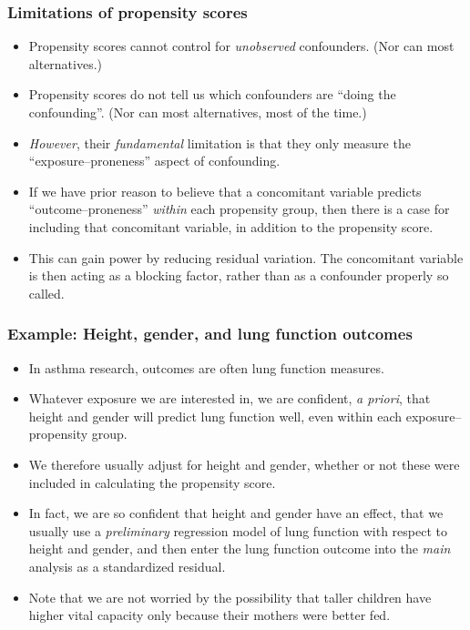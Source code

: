 \documentclass[11pt]{beamer}
\begin{document}
\begin{frame}
\frametitle{Limitations of propensity scores}

\begin{itemize}

\item<2-> Propensity scores cannot control for \textit{unobserved} confounders. (Nor can most alternatives.)

\item<3-> Propensity scores do not tell us which confounders are ``doing the confounding''. (Nor can most alternatives, most of the time.)

\item<4-> \textit{However}, their \textit{fundamental} limitation is that they only measure the ``exposure--proneness'' aspect of confounding.

\item<5-> If we have prior reason to believe that a concomitant variable predicts ``outcome--proneness'' \textit{within} each propensity group,
then there is a case for including that concomitant variable, in addition to the propensity score.

\item<6-> This can gain power by reducing residual variation.
The concomitant variable is then acting as a blocking factor,
rather than as a confounder properly so called.

\end{itemize}

\end{frame}

\begin{frame}
\frametitle{Example: Height, gender, and lung function outcomes}

\begin{itemize}

\item<2-> In asthma research, outcomes are often lung function measures.

\item<3-> Whatever exposure we are interested in,
we are confident, \textit{a priori}, that height and gender will predict lung function well,
even within each exposure--propensity group.

\item<4-> We therefore usually adjust for height and gender,
whether or not these were included in calculating the propensity score.

\item<5-> In fact, we are so confident that height and gender have an effect,
that we usually use a \textit{preliminary} regression model of lung function with respect to height and gender,
and then enter the lung function outcome into the \textit{main} analysis as a standardized residual.

\item<6-> Note that we are not worried by the possibility
that taller children have higher vital capacity only because their mothers were better fed.

\end{itemize}

\end{frame}
\end{document}

